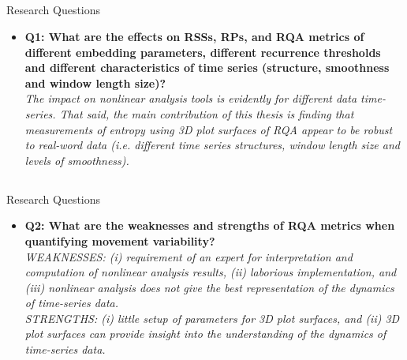 \subsection{}
{

\begin{frame}{Research Questions}

\begin{itemize}
	\item \textbf{ 
	Q1: What are the effects on RSSs, RPs, and RQA metrics
	of different embedding parameters, different recurrence thresholds 
	and different characteristics of time series 
	(structure, smoothness and window length size)?
	} \\
	\textit{
The impact on nonlinear analysis tools is evidently for different
data time-series. That said, the main contribution of this thesis is
finding that measurements of entropy using 3D plot surfaces of RQA 
appear to be robust to real-word data (i.e. different time series
structures, window length size and levels of smoothness).
}

\end{itemize}

\end{frame}
}




\subsection{}
{

\begin{frame}{Research Questions}

\begin{itemize}
	\item \textbf{ 
	Q2: What are the weaknesses and strengths of 
	RQA metrics when quantifying movement variability?	
} \\
	\textit{
WEAKNESSES: (i) requirement of an expert for interpretation and 
computation of nonlinear analysis results, 
(ii) laborious implementation, and 
(iii) nonlinear analysis does not give the best representation
of the dynamics of time-series data. \\
STRENGTHS: (i) little setup of parameters for 3D plot surfaces, and
(ii) 3D plot surfaces can provide insight into the understanding
of the dynamics of time-series data.
}

\end{itemize}

\end{frame}
}



